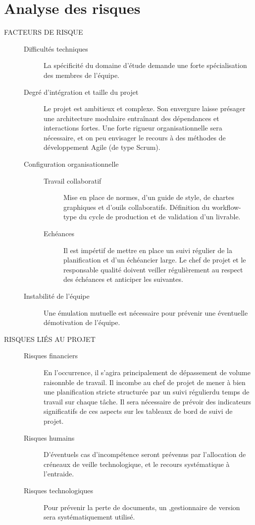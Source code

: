 \documentclass[11pt, a4paper]{article}
\begin{document}
\section{Analyse des risques}
\begin{description}
  \item [FACTEURS DE RISQUE] 
  \begin{description}
    \item [Difficultés techniques] La spécificité du domaine d'étude demande une forte spécialisation des membres de l'équipe. 
    \item [Degré d'intégration et taille du projet] Le projet est ambitieux et complexe. Son envergure laisse présager une architecture modulaire
      entraînant des dépendances et interactions fortes.
      \Rightarrow Une forte rigueur organisationnelle sera nécessaire, et on peu envisager le recours à des méthodes de développement Agile (de type Scrum).
    \item [Configuration organisationnelle]
      \begin{description}
        \item [Travail collaboratif]
          \Rightarrow Mise en place de normes, d'un guide de style, de chartes graphiques et d'ouils collaboratifs.
          Définition du workflow-type du cycle de production et de validation d'un livrable.
        \item [Echéances]
          \Rightarrow Il est impértif de mettre en place un suivi régulier de la planification et d'un échéancier large.
          Le chef de projet et le responsable qualité doivent veiller régulièrement au respect des échéances et anticiper les suivantes.
      \end{description}
    \item [Instabilité de l'équipe] Une émulation mutuelle est nécessaire pour prévenir une éventuelle démotivation de l'équipe.
  \end{description}
  \item [RISQUES LIÉS AU PROJET] 
  \begin{description}
    \item [Risques financiers] En l'occurrence, il s'agira principalement de dépassement de volume raisonnble de travail.
      \Rightarrow Il incombe au chef de projet de mener à bien une planification stricte structurée par un suivi régulierdu temps de travail sur chaque tâche.
      Il sera nécessaire de prévoir des indicateurs significatifs de ces aspects sur les tableaux de bord de suivi de projet. 
    \item [Risques humains] D'éventuels cas d'incompétence seront prévenus par l'allocation de créneaux de veille technologique, et le recours systématique à l'entraide.
    \item [Risques technologiques] Pour prévenir la perte de documents, un ,gestionnaire de version sera systématiquement utilisé.
  \end{description}
\end{description}
\end{document}
